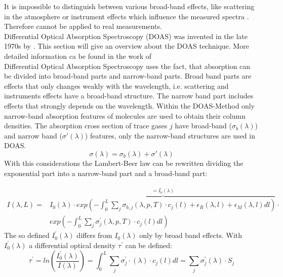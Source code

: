 \documentclass  [
  paper    = a4,
  BCOR     = 10mm,
  twoside,
  fontsize = 12pt,
  fleqn,
  toc      = bibnumbered,
  toc      = listofnumbered,
  numbers  = noendperiod,
  headings = normal,
  listof   = leveldown,
  version  = 3.03
]                                       {scrreprt}
\begin{document}
	It is impossible to distinguish between various broad-band effects, like scattering in the atmosphere or instrument effects which influence the measured spectra \citep{lubcke2014optical}. Therefore  cannot be applied to real measurements.\\
	Differential Optical Absorption Spectroscopy (DOAS) was invented in the late 1970s by \cite{perner1979detection}. This section will give an overview about the DOAS technique. More detailed information ca be found in the work of \cite{platt2008differential}\\
	\newline
	Differential Optical Absorption Spectroscopy uses the fact, that absorption can be divided into broad-band parts and narrow-band parts. Broad band parts are effects that only changes weakly with the wavelength,  i.e. scattering and instruments effects have a broad-band structure. 
	The narrow band part includes effects that strongly depends on the wavelength.
	Within the DOAS-Method only narrow-band absorption features of molecules are used to obtain their column densities.
	The absorption cross section of trace gases $j$ have broad-band ($\sigma_b\left(\lambda \right)$) and narrow band ($\sigma{'}\left(\lambda \right)$) features, only the narrow-band structures are used in DOAS.
	\begin{equation}
	\sigma\left(\lambda \right) = \sigma_b\left(\lambda \right) + \sigma{'}\left(\lambda \right)
	\end{equation}
	With this considerations the Lambert-Beer law  can be rewritten
	dividing the exponential part into a narrow-band part and a broad-band part:

	\begin{align}
	I\left(\lambda,L\right) = &\overbrace{I_{0}\left(\lambda\right)\cdot exp\left(-\int^{L}_{0}\sum_{j}\sigma_{b,j}\left(\lambda,p,T\right)\cdot c_{j}\left(l\right)+\epsilon_R\left(\lambda,l\right)+\epsilon_{M}\left(\lambda,l\right)dl\right)}^{=I^{'}_0\left(\lambda\right)} \cdot \nonumber \\
	&exp\left(-\int^{L}_{0}\sum_{j}\sigma_{j}^{'}\left(\lambda,p,T\right)\cdot c_{j}\left(l\right)dl\right)
	\label{eq:bb}
	\end{align}	
	The so defined $I^{'}_0\left(\lambda\right)$ differs from $I_0\left(\lambda\right)$ only by broad band effects. With $I^{'}_0\left(\lambda\right)$ a differential optical density $\tau^{'}$ can be defined:
	\begin{equation}
	\tau^{'} = ln\left(\frac{I^{'}_0\left(\lambda\right)}{I\left(\lambda\right)}\right) = \int_{0}^{L} \sum_{j} \sigma^{'}_{j} \cdot \left(\lambda\right) \cdot c_{j}\left(l\right)dl = \sum_{j}\sigma^{'}_{j}\left(\lambda\right)\cdot S_{j}
	\label{eq:taustrich}
	\end{equation}
	
\end{document}
